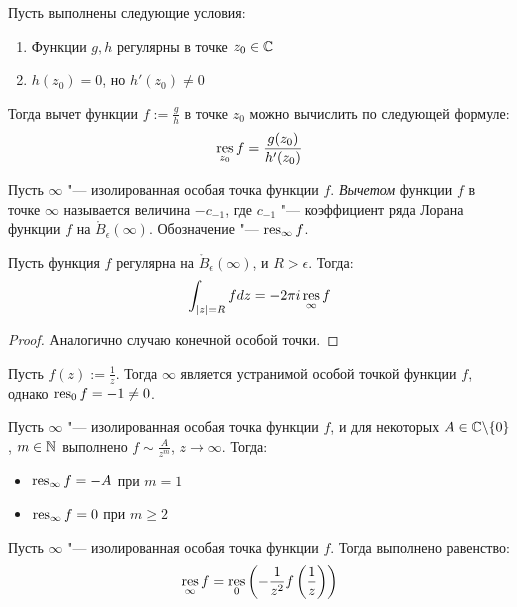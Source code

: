 \begin{proposition}
	Пусть выполнены следующие условия:
	\begin{enumerate}
		\item Функции $g, h$ регулярны в точке $z_0 \in \mathbb{C}$
		\item $h(z_0) = 0$, но $h'(z_0) \ne 0$
	\end{enumerate}

	Тогда вычет функции $f := \frac{g}{h}$ в точке $z_0$ можно вычислить по следующей формуле:
	\[\operatorname*{res}_{z_0}f = \frac{g(z_0)}{h'(z_0)}\]
\end{proposition}

\begin{definition}
	Пусть $\infty$ "--- изолированная особая точка функции $f$. \textit{Вычетом} функции $f$ в точке $\infty$ называется величина $-c_{-1}$, где $c_{-1}$ "--- коэффициент ряда Лорана функции $f$ на $\mathring B_\epsilon(\infty)$. Обозначение "--- $\operatorname*{res}_{\infty}f$.
\end{definition}

\begin{proposition}
	Пусть функция $f$ регулярна на $\mathring B_\epsilon(\infty)$, и $R > \epsilon$. Тогда:
	\[\int_{|z| = R}fdz = -2\pi i\operatorname*{res}_\infty f\]
\end{proposition}

\begin{proof}
	Аналогично случаю конечной особой точки.
\end{proof}

\begin{example}
	Пусть $f(z) := \frac 1z$. Тогда $\infty$ является устранимой особой точкой функции $f$, однако $\operatorname*{res}_0{f} = -1 \ne 0$.
\end{example}

\begin{proposition}
	Пусть $\infty$ "--- изолированная особая точка функции $f$, и для некоторых $A \in \mathbb{C} \backslash \{0\}$, $m \in \mathbb{N}$ выполнено $f \sim \frac{A}{z^m}$, $z \to \infty$. Тогда:
	\begin{itemize}
		\item $\operatorname*{res}_\infty f = -A$ при $m = 1$
		\item $\operatorname*{res}_\infty f = 0$ при $m \ge 2$
	\end{itemize}
\end{proposition}

\begin{proposition}
	Пусть $\infty$ "--- изолированная особая точка функции $f$. Тогда выполнено равенство:
	\[\operatorname*{res}_\infty f = \operatorname*{res}_0\left(-\frac1{z^2}f\left(\frac1z\right)\right)\]
\end{proposition}

